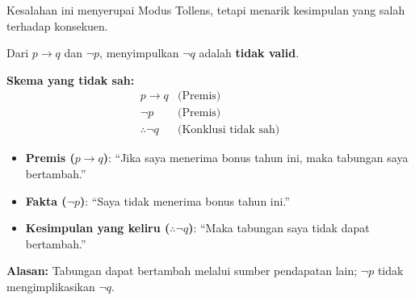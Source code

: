 Kesalahan ini menyerupai Modus Tollens, tetapi menarik kesimpulan yang salah terhadap konsekuen.

\begin{teorema}
Dari $p \rightarrow q$ dan $\neg p$, menyimpulkan $\neg q$ adalah \textbf{tidak valid}.
\end{teorema}

\textbf{Skema yang tidak sah:}
\[
\begin{array}{cl}
p \rightarrow q & \text{(Premis)} \\
\neg p & \text{(Premis)} \\
\hline
\therefore \neg q & \text{(Konklusi tidak sah)}
\end{array}
\]

\begin{contoh}
\begin{itemize}
    \item \textbf{Premis ($p \rightarrow q$)}: ``Jika saya menerima bonus tahun ini, maka tabungan saya bertambah.''
    \item \textbf{Fakta ($\neg p$)}: ``Saya tidak menerima bonus tahun ini.''
    \item \textbf{Kesimpulan yang keliru ($\therefore \neg q$)}: ``Maka tabungan saya tidak dapat bertambah.''
\end{itemize}
\textbf{Alasan:} Tabungan dapat bertambah melalui sumber pendapatan lain; $\neg p$ tidak mengimplikasikan $\neg q$.
\end{contoh}
